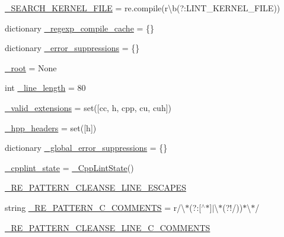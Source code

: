 \begin{DoxyCompactItemize}
\item 
\hyperlink{namespacecpplint_a0ebfae753fc7e59a9921df1bc576654c}{\+\_\+\+S\+E\+A\+R\+C\+H\+\_\+\+K\+E\+R\+N\+E\+L\+\_\+\+F\+I\+LE} = re.\+compile(r\textquotesingle{}\textbackslash{}b(?\+:L\+I\+N\+T\+\_\+\+K\+E\+R\+N\+E\+L\+\_\+\+F\+I\+LE)\textquotesingle{})
\item 
dictionary \hyperlink{namespacecpplint_af7e2f028042409f5aa8cfc52f283d134}{\+\_\+regexp\+\_\+compile\+\_\+cache} = \{\}
\item 
dictionary \hyperlink{namespacecpplint_adef2c809eebe6d4b8cc2c314f1485b96}{\+\_\+error\+\_\+suppressions} = \{\}
\item 
\hyperlink{namespacecpplint_aaf6dcfd2e05bfc2a4ec4f758e05d45e2}{\+\_\+root} = None
\item 
int \hyperlink{namespacecpplint_ab59a11cdee470ff44dae2c9a3cf1fa22}{\+\_\+line\+\_\+length} = 80
\item 
\hyperlink{namespacecpplint_ae969d2ba7b74119c32022cdb60beb15c}{\+\_\+valid\+\_\+extensions} = set(\mbox{[}\textquotesingle{}cc\textquotesingle{}, \textquotesingle{}h\textquotesingle{}, \textquotesingle{}cpp\textquotesingle{}, \textquotesingle{}cu\textquotesingle{}, \textquotesingle{}cuh\textquotesingle{}\mbox{]})
\item 
\hyperlink{namespacecpplint_aa6c6e506c79bdba0431362eca044f02f}{\+\_\+hpp\+\_\+headers} = set(\mbox{[}\textquotesingle{}h\textquotesingle{}\mbox{]})
\item 
dictionary \hyperlink{namespacecpplint_aaf1984eefec12747ebd33a7d3d3fafd2}{\+\_\+global\+\_\+error\+\_\+suppressions} = \{\}
\item 
\hyperlink{namespacecpplint_a8ea348311551951f3999dc9c8a25842b}{\+\_\+cpplint\+\_\+state} = \hyperlink{classcpplint_1_1__CppLintState}{\+\_\+\+Cpp\+Lint\+State}()
\item 
\hyperlink{namespacecpplint_acb6f93120f1c7ff091fd9dea38ee89df}{\+\_\+\+R\+E\+\_\+\+P\+A\+T\+T\+E\+R\+N\+\_\+\+C\+L\+E\+A\+N\+S\+E\+\_\+\+L\+I\+N\+E\+\_\+\+E\+S\+C\+A\+P\+ES}
\item 
string \hyperlink{namespacecpplint_a8136c2c09e0e4c2f27a9333a347dc983}{\+\_\+\+R\+E\+\_\+\+P\+A\+T\+T\+E\+R\+N\+\_\+\+C\+\_\+\+C\+O\+M\+M\+E\+N\+TS} = r\textquotesingle{}/\textbackslash{}$\ast$(?\+:\mbox{[}$^\wedge$$\ast$\mbox{]}$\vert$\textbackslash{}$\ast$(?!/))$\ast$\textbackslash{}$\ast$/\textquotesingle{}
\item 
\hyperlink{namespacecpplint_a4c7a1f6077a72f4d5b5223cca4823670}{\+\_\+\+R\+E\+\_\+\+P\+A\+T\+T\+E\+R\+N\+\_\+\+C\+L\+E\+A\+N\+S\+E\+\_\+\+L\+I\+N\+E\+\_\+\+C\+\_\+\+C\+O\+M\+M\+E\+N\+TS}
$$
\end{DoxyCompactItemize}
